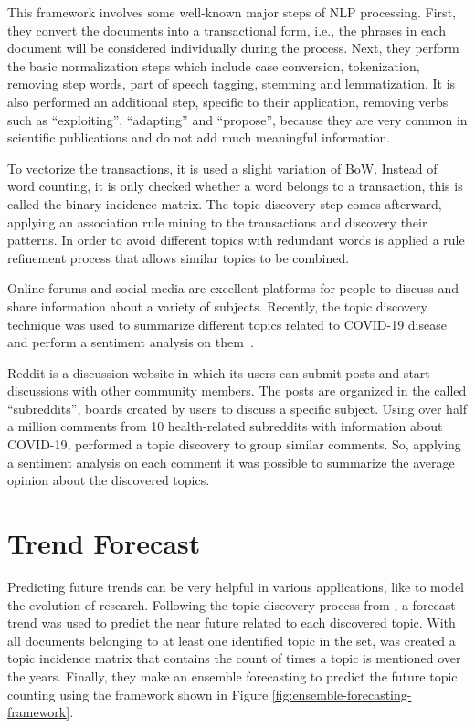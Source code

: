 This framework involves some well-known major steps of NLP processing. First, they convert the documents into a transactional form, i.e., the phrases in each document will be considered individually during the process. Next, they perform the basic normalization steps which include case conversion, tokenization, removing step words, part of speech tagging, stemming and lemmatization. It is also performed an additional step, specific to their application, removing verbs such as ``exploiting'', ``adapting'' and ``propose'', because they are very common in scientific publications and do not add much meaningful information.

To vectorize the transactions, it is used a slight variation of BoW. Instead of word counting, it is only checked whether a word belongs to a transaction, this is called the binary incidence matrix. The topic discovery step comes afterward, applying an association rule mining to the transactions and discovery their patterns. In order to avoid different topics with redundant words is applied a rule refinement process that allows similar topics to be combined.

Online forums and social media are excellent platforms for people to discuss and share information about a variety of subjects. Recently, the topic discovery technique was used to summarize different topics related to COVID-19 disease and perform a sentiment analysis on them~\cite{jelodar2020deep}.

Reddit is a discussion website in which its users can submit posts and start discussions with other community members. The posts are organized in the called ``subreddits'', boards created by users to discuss a specific subject. Using over half a million comments from 10 health-related subreddits with information about COVID-19,  performed a topic discovery to group similar comments. So, applying a sentiment analysis on each comment it was possible to summarize the average opinion about the discovered topics.


\section{Trend Forecast}

Predicting future trends can be very helpful in various applications, like to model the evolution of research. Following the topic discovery process from , a forecast trend was used to predict the near future related to each discovered topic. With all documents belonging to at least one identified topic in the set, was created a topic incidence matrix that contains the count of times a topic is mentioned over the years. Finally, they make an ensemble forecasting to predict the future topic counting using the framework shown in Figure \ref{fig:ensemble-forecasting-framework}.

